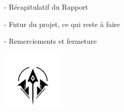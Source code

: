
- Récapitulatif du Rapport

- Futur du projet, ce qui reste à faire

- Remerciements et fermeture


\centering
\vspace*{0.8cm}
\includegraphics[width=3cm]{0.format/logo.png}
